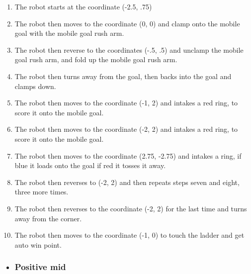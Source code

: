 \begin{enumerate}
    \item The robot starts at the coordinate (-2.5, .75)
    \item The robot then moves to the coordinate (0, 0) and clamp onto the mobile goal with the mobile goal rush arm.
    \item The robot then reverse to the coordinates (-.5, .5) and unclamp the mobile goal rush arm, and fold up the mobile goal rush arm.
    \item The robot then turns away from the goal, then backs into the goal and clamps down.
    \item The robot then moves to the coordinate (-1, 2) and intakes a red ring, to score it onto the mobile goal.
    \item The robot then moves to the coordinate (-2, 2) and intakes a red ring, to score it onto the mobile goal.
    \item The robot then moves to the coordinate (2.75, -2.75) and intakes a ring, if blue it loads onto the goal if red it tosses it away.
    \item The robot then reverses to (-2, 2) and then repeats steps seven and eight, three more times.
    \item The robot then reverses to the coordinate (-2, 2) for the last time and turns away from the corner.
    \item The robot then moves to the coordinate (-1, 0) to touch the ladder and get auto win point.
\end{enumerate}
\begin{itemize}
    \item \subsubsection{Positive mid}
\end{itemize}
